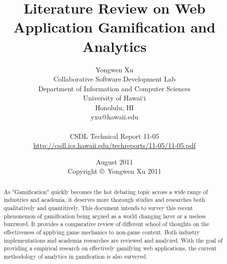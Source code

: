 \documentclass[11pt]{report}
\begin{document}
\title{Literature Review on Web Application Gamification and Analytics}
\author{Yongwen Xu \\
Collaborative Software Development Lab \\
Department of Information and Computer Sciences \\
University of Hawai`i \\
Honolulu, HI \\
yxu@hawaii.edu \\
\\
CSDL Technical Report 11-05 \\
\url{http://csdl.ics.hawaii.edu/techreports/11-05/11-05.pdf}
}
\date{August 2011\\[3pt]
Copyright \copyright\ Yongwen Xu 2011}

\maketitle

\tableofcontents

\begin{abstract}
As "Gamification" quickly becomes the hot debating topic across a wide range of industries and academia, it deserves more thorough studies and researches both qualitatively and quantitively. This document intends to survey this recent phenonemon of gamification being argued as a world changing layer or a useless buzzword. It provides a comparative review of different school of thoughts on the effectiveness of applying game mechanics to non-game context. Both industry implementations and academia researches are reviewed and analyzed. With the goal of providing a empirical research on effectively gamifying web applications, the current methodology of analytics in gamfication is also surveyed.
\end{abstract}









%
%
\end{document}
